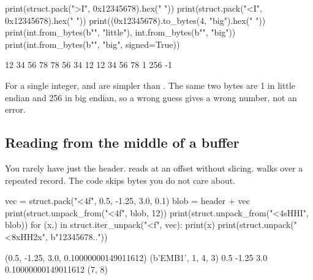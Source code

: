 \begin{center}
\end{center}

\begin{pycode}
print(struct.pack(">I", 0x12345678).hex(" "))
print(struct.pack("<I", 0x12345678).hex(" "))
print((0x12345678).to_bytes(4, "big").hex(" "))
print(int.from_bytes(b"", "little"), int.from_bytes(b"", "big"))
print(int.from_bytes(b"\xff\xff", "big", signed=True))
\end{pycode}
\begin{rawcode}
12 34 56 78
78 56 34 12
12 34 56 78
1 256
-1
\end{rawcode}

For a single integer,  and  are simpler than
. The same two bytes  are 1 in little endian and 256 in big endian, so a
wrong guess gives a wrong number, not an error.

\subsection{Reading from the middle of a buffer}

You rarely have just the header.  reads at an offset without
slicing.  walks over a repeated record. The  code skips bytes you do not
care about.

\begin{pycode}
vec = struct.pack("<4f", 0.5, -1.25, 3.0, 0.1)
blob = header + vec
print(struct.unpack_from("<4f", blob, 12))
print(struct.unpack_from("<4sHHI", blob))
for (x,) in struct.iter_unpack("<f", vec):
    print(x)
print(struct.unpack("<8xHH2x", b"12345678.."))
\end{pycode}
\begin{rawcode}
(0.5, -1.25, 3.0, 0.10000000149011612)
(b'EMB1', 1, 4, 3)
0.5
-1.25
3.0
0.10000000149011612
(7, 8)
\end{rawcode}

